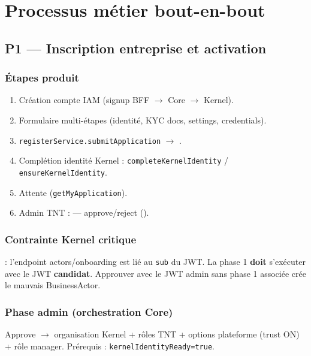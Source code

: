 \chapter{Processus métier bout-en-bout}

\section{P1 --- Inscription entreprise et activation}

\subsection{Étapes produit}

\begin{enumerate}
  \item Création compte IAM (signup BFF $\rightarrow$ Core $\rightarrow$ Kernel).
  \item Formulaire multi-étapes 
        (identité, KYC docs, settings, credentials).
  \item \texttt{registerService.submitApplication} $\rightarrow$
        .
  \item Complétion identité Kernel :
        \texttt{completeKernelIdentity} / \texttt{ensureKernelIdentity}.
  \item Attente  (\texttt{getMyApplication}).
  \item Admin TNT :  --- approve/reject
        ().
\end{enumerate}

\subsection{Contrainte Kernel critique}

 : l'endpoint actors/onboarding est lié au
\texttt{sub} du JWT. La phase 1 \textbf{doit} s'exécuter avec le JWT
\textbf{candidat}. Approuver avec le JWT admin sans phase 1 associée crée le
mauvais BusinessActor.

\subsection{Phase admin (orchestration Core)}

Approve $\rightarrow$ organisation Kernel + rôles TNT + options plateforme
(trust ON) + rôle manager. Prérequis : \texttt{kernelIdentityReady=true}.

